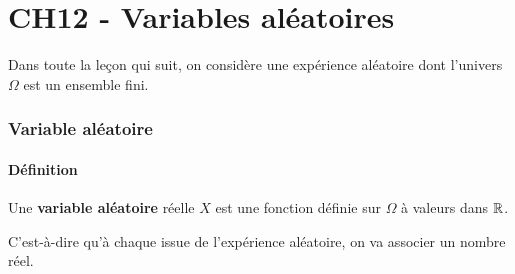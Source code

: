 \documentclass[a4paper,11pt]{article}
\author{Pierquet}
\title{\nomfichier}
\begin{document}
\newcommand\carte[2]{
	\ifthenelse{\equal{#2}{T}}{\tcbox[cartepoker]{#1\ding{168}}}{}
	\ifthenelse{\equal{#2}{P}}{\tcbox[cartepoker]{#1\ding{171}}}{}
	\ifthenelse{\equal{#2}{C}}{\tcbox[cartepoker]{\red #1\ding{170}}}{}
	\ifthenelse{\equal{#2}{K}}{\tcbox[cartepoker]{\red #1\ding{169}}}{}
}

\newcommand\ecartv{$\vphantom{\dfrac{1}{32}}$}

\pagestyle{fancy}

\part{CH12 - Variables aléatoires}

\medskip

\begin{ccadre}
Dans toute la leçon qui suit, on considère une expérience aléatoire dont l'univers $\Omega$ est un ensemble fini.
\end{ccadre}

\section{Variable aléatoire}

\subsection{Définition}

\begin{cdefi}
Une \textbf{variable aléatoire} réelle $X$ est une fonction définie sur $\Omega$ à valeurs dans  $\R$.

C'est-à-dire qu'à chaque issue de l'expérience aléatoire, on va associer un nombre réel.
\end{cdefi}
\end{document}
